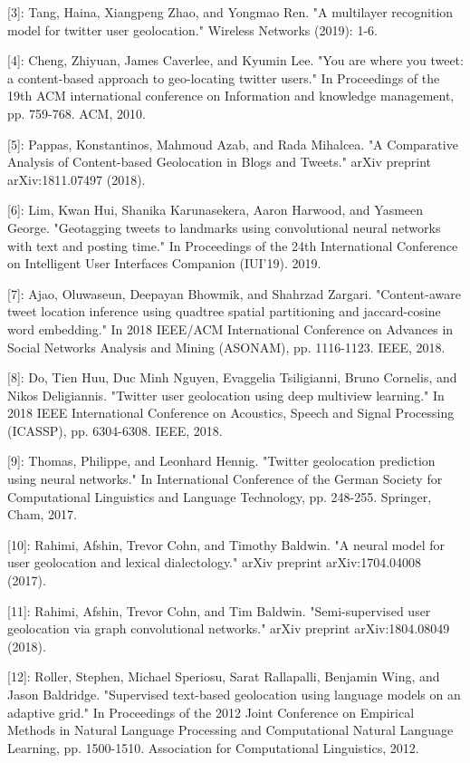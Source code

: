 \documentclass[11pt]{article}
\begin{document}
[3]: Tang, Haina, Xiangpeng Zhao, and Yongmao Ren. "A multilayer recognition model for twitter user geolocation." Wireless Networks (2019): 1-6.

[4]: Cheng, Zhiyuan, James Caverlee, and Kyumin Lee. "You are where you tweet: a content-based approach to geo-locating twitter users." In Proceedings of the 19th ACM international conference on Information and knowledge management, pp. 759-768. ACM, 2010.

[5]: Pappas, Konstantinos, Mahmoud Azab, and Rada Mihalcea. "A Comparative Analysis of Content-based Geolocation in Blogs and Tweets." arXiv preprint arXiv:1811.07497 (2018).

[6]: Lim, Kwan Hui, Shanika Karunasekera, Aaron Harwood, and Yasmeen George. "Geotagging tweets to landmarks using convolutional neural networks with text and posting time." In Proceedings of the 24th International Conference on Intelligent User Interfaces Companion (IUI’19). 2019.

[7]: Ajao, Oluwaseun, Deepayan Bhowmik, and Shahrzad Zargari. "Content-aware tweet location inference using quadtree spatial partitioning and jaccard-cosine word embedding." In 2018 IEEE/ACM International Conference on Advances in Social Networks Analysis and Mining (ASONAM), pp. 1116-1123. IEEE, 2018.

[8]: Do, Tien Huu, Duc Minh Nguyen, Evaggelia Tsiligianni, Bruno Cornelis, and Nikos Deligiannis. "Twitter user geolocation using deep multiview learning." In 2018 IEEE International Conference on Acoustics, Speech and Signal Processing (ICASSP), pp. 6304-6308. IEEE, 2018.

[9]: Thomas, Philippe, and Leonhard Hennig. "Twitter geolocation prediction using neural networks." In International Conference of the German Society for Computational Linguistics and Language Technology, pp. 248-255. Springer, Cham, 2017.

[10]: Rahimi, Afshin, Trevor Cohn, and Timothy Baldwin. "A neural model for user geolocation and lexical dialectology." arXiv preprint arXiv:1704.04008 (2017).

[11]: Rahimi, Afshin, Trevor Cohn, and Tim Baldwin. "Semi-supervised user geolocation via graph convolutional networks." arXiv preprint arXiv:1804.08049 (2018).

[12]: Roller, Stephen, Michael Speriosu, Sarat Rallapalli, Benjamin Wing, and Jason Baldridge. "Supervised text-based geolocation using language models on an adaptive grid." In Proceedings of the 2012 Joint Conference on Empirical Methods in Natural Language Processing and Computational Natural Language Learning, pp. 1500-1510. Association for Computational Linguistics, 2012.
\end{document}
